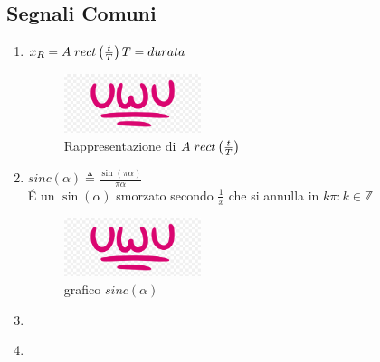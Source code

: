     \subsection{Segnali Comuni}\label{Segnali Comuni}
    \begin{enumerate}
        \item {
            $x_R=A\hspace{0.1cm}rect\left(\frac{t}{T}\right) T = durata $
                \begin{figure}[H]
                    \centering
                    \includegraphics[width=4cm]{media/uwu.png}
                    \caption{Rappresentazione di $A\hspace{0.1cm}rect\left(\frac{t}{T}\right)$}
                    \label{fig:grafico rect}
            \end{figure}                
        }
        \item {
            $sinc(\alpha)\triangleq\frac{\sin(\pi\alpha)}{\pi\alpha}$\\ 
            É un $\sin(\alpha)$ smorzato secondo $\frac{1}{x}$ che si annulla in $k\pi: k\in\mathbb{Z}$
            \begin{figure}[htp]
                \centering
                \includegraphics[width=4cm]{media/uwu.png}
                \caption{grafico $sinc(\alpha)$}
                \label{fig:grafico sinc2}
            \end{figure}
        }
        \item {
        }
        \item {
        }
    \end{enumerate}